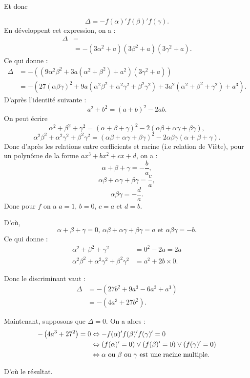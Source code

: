 \begin{demonstration}
Et donc 

\[
\Delta = - f(\alpha)' f(\beta )' f(\gamma)
.\] 
En développent cet expression, on a :
\begin{align*}
    \Delta &=  \\
      &= - \left( 3 \alpha^2 + a \right) \left( 3 \beta^2 + a \right) \left( 3 \gamma^2 + a \right) 
.\end{align*}
Ce qui donne :
\begin{align*}
    \Delta  &= - \left( ( 9 \alpha^2 \beta^2 + 3a ( \alpha^2 + \beta^2 ) + a^2 ) ( 3 \gamma^2 + a ) \right)  \\
       &= - \left( 27 \left( \alpha \beta \gamma \right)^2  + 9a \left( \alpha^2 \beta^2 + \alpha^2 \gamma^2 + \beta^2 \gamma^2 \right) + 3a^2 \left( \alpha^2 + \beta^2 + \gamma^2 \right) + a^3 \right) 
.\end{align*}
D'après l'identité suivante :
\[
a^2 + b^2 = \left( a + b \right)^2 - 2ab 
.\] 
On peut écrire
\[
\alpha^2 + \beta^2 + \gamma^2 = \left( \alpha + \beta + \gamma \right)^2 - 2 \left( \alpha \beta + \alpha \gamma + \beta \gamma \right)
,\] 
\[
\alpha^2 \beta^2 + \alpha^2 \gamma^2 + \beta^2 \gamma^2 = \left( \alpha \beta + \alpha \gamma + \beta \gamma \right)^2 - 2\alpha \beta \gamma \left( \alpha + \beta + \gamma \right)
.\] 
Donc d'après les relations entre cœfficients et racine (i.e relation de Viète), pour un polynôme de la forme $ax^3 + bx^2 + cx + d$, on a :
\[
\alpha + \beta + \gamma = - \frac{b}{a}
,\] 
\[
\alpha \beta + \alpha \gamma + \beta \gamma = \frac{c}{a}
,\] 
\[
\alpha \beta \gamma = - \frac{d}{a}
.\] 
Donc pour $f$ on a $a = 1$, $b = 0$, $c = a$ et $d = b$.

D'où,
\[
\alpha + \beta + \gamma = 0 \text{, } \alpha \beta + \alpha \gamma + \beta \gamma = a \text{ et } \alpha \beta \gamma = - b
.\] 
Ce qui donne : 
\begin{align*}
    \alpha^2 + \beta^2 + \gamma^2 &= 0^2 - 2a = 2a \\
    \alpha^2 \beta^2 + \alpha^2 \gamma^2 + \beta^2 \gamma^2 &= a^2 + 2b \times 0
.\end{align*}

Donc le discriminant vaut :
\begin{align*}
    \Delta &= - \left( 27b^2 + 9a^3 - 6a^3 + a^3  \right) \\
        &= - \left( 4a^3 + 27b^2  \right)
.\end{align*}

Maintenant, supposons que $\Delta = 0$. On a alors :
 \begin{align*}
     - \left( 4a^3 + 27^2 \right) = 0 &\Leftrightarrow - f(\alpha)' f(\beta )' f(\gamma)' = 0 \\
                                      & \Leftrightarrow \left( f(\alpha)' = 0 \right) \vee \left( f(\beta )' = 0 \right) \vee \left( f(\gamma)' = 0 \right) \\
                                      &\Leftrightarrow \alpha \text{ ou } \beta \text{ ou } \gamma \text{ est une racine multiple}
.\end{align*}

D'où le résultat.
\end{demonstration}
